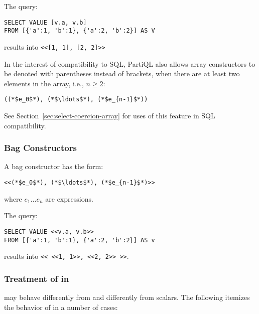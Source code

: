 \begin{example}
The query:

\begin{lstlisting}
SELECT VALUE [v.a, v.b]
FROM [{'a':1, 'b':1}, {'a':2, 'b':2}] AS V
\end{lstlisting}

\noindent results into \lstinline|<<[1, 1], [2, 2]>>| 
\end{example}

In the interest of compatibility to SQL, PartiQL also allows array constructors
to be denoted with parentheses instead of brackets, when there are at least two
elements in the array, i.e., $n \geq 2$:

\begin{lstlisting}
((*$e_0$*), (*$\ldots$*), (*$e_{n-1}$*))
\end{lstlisting}

See Section~\ref{sec:select-coercion-array} for uses of this feature in SQL
compatibility.

\subsubsection{Bag Constructors}
A bag constructor has the form:

\begin{lstlisting}
<<(*$e_0$*), (*$\ldots$*), (*$e_{n-1}$*)>>
\end{lstlisting}

\noindent where $e_1 \ldots e_n$ are expressions.

\begin{example}
The query:

\begin{lstlisting}
SELECT VALUE <<v.a, v.b>>
FROM [{'a':1, 'b':1}, {'a':2, 'b':2}] AS v
\end{lstlisting}

\noindent results into \lstinline|<< <<1, 1>>, <<2, 2>> >>|. 
\end{example}

\subsubsection{Treatment of \MISSING in }
\label{sec:treatment-missing-select-value}

\MISSING may behave differently from \NULL and differently from scalars.
The following itemizes the behavior of \MISSING in a number of cases:

